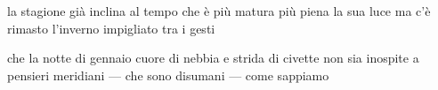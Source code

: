 
\begin{poem}
	\begin{stanza}
		la stagione già inclina\verseline
		al tempo che è più matura\verseline
		più piena la sua luce\verseline
		ma c’è rimasto l’inverno\verseline
		impigliato tra i gesti
	\end{stanza}
\end{poem}

\clearpage


\begin{poem}
	\begin{stanza}
		che la notte di gennaio\verseline
		cuore di nebbia e strida di civette\verseline
		non sia inospite a pensieri meridiani\verseline
		— che sono disumani\verseline
		— come sappiamo
	\end{stanza}
\end{poem}
